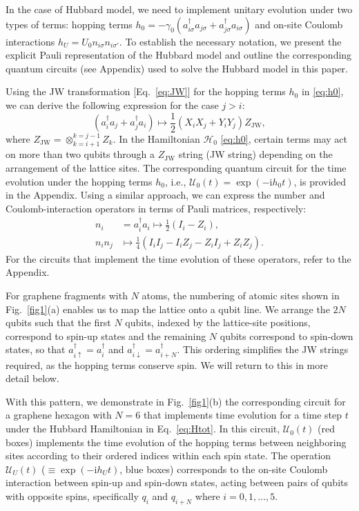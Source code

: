 \documentclass[twocolumn,superscriptaddress,amsmath,amssymb,showpacs,floatfix,preprintnumbers]{revtex4-1}
\newcommand{\rmi}{\mathrm{i}}
\newcommand{\s}{\sigma}
\newcommand{\mc}{\mathcal}
\newcommand{\mr}{\mathrm}
\begin{document}
In the case of Hubbard model, we need to implement unitary evolution under two types of terms:
hopping terms $ h_0 = -\gamma_0 (a^\dagger_{i \s} a_{j \s} + a^\dagger_{j \s} a_{i \s}) $ 
and on-site Coulomb interactions $ h_U = U_0 n_{i \s} n_{i \s'} $.
%
To establish the necessary notation, we present the explicit Pauli representation of the 
Hubbard model and outline the corresponding quantum circuits (see Appendix) used to solve 
the Hubbard model in this paper.

Using the JW transformation [Eq.~\eqref{eq:JW}] for the hopping terms $h_0$ in \eqref{eq:h0}, 
we can derive the following expression for the case $j > i$: 
\begin{equation} \label{eq:hop}
	(a^\dagger_{i} a_{j} + a^\dagger_{j} a_{i}) \mapsto 
	\frac{1}{2}(X_i X_j + Y_i Y_j) Z_\mr{JW},
\end{equation}
%
where $Z_\mr{JW} = \otimes_{k=i+1}^{k=j-1} Z_{k}$.
In the Hamiltonian $\mc H_0$ \eqref{eq:h0}, certain terms may act on more than two qubits 
through a $Z_\mr{JW}$ string (JW string) depending on the arrangement of the lattice sites. 
%
The corresponding quantum circuit for the time evolution under the hopping terms $h_0$, i.e.,
 $ \mc U_0(t) = \exp(-\rmi h_0 t) $, is provided in the Appendix.
%
Using a similar approach, we can express the number and Coulomb-interaction operators 
in terms of Pauli matrices, respectively: 
\begin{align}
	n_{i} &= a^\dagger_{i} a_{i} \mapsto \frac{1}{2}(I_i - Z_i), \label{eq:num} \\ 
	n_{i} n_{j} &\mapsto \frac{1}{4}(I_i I_j - I_i Z_j - Z_i I_j + Z_i Z_j). \label{eq:hub} 
\end{align}
%
For the circuits that implement the time evolution of these operators, refer to the Appendix.

For graphene fragments with $N$ atoms, the numbering of atomic sites shown in
Fig.~\ref{fig1}(a) enables us to map the lattice onto a qubit line.
%
We arrange the $2N$ qubits such that the first $N$ qubits, indexed by the lattice-site positions,
correspond to spin-up states and the remaining $N$ qubits correspond to spin-down states, so that
$ a^\dagger_{i \uparrow} = a^\dagger_{i} $ and $ a^\dagger_{i \downarrow} = a^\dagger_{i+N} $.
%
This ordering simplifies the JW strings required, as the hopping terms conserve spin.
We will return to this in more detail below.

With this pattern,  we demonstrate in Fig.~\ref{fig1}(b) the corresponding circuit for a graphene
hexagon with $N = 6$ that implements time evolution for a time step $t$ under the Hubbard 
Hamiltonian in Eq.~\ref{eq:Htot}.
%
In this circuit, $\mc U_0(t)$ (red boxes) implements the time evolution of the hopping terms between 
neighboring sites according to their ordered indices within each spin state.
%
The operation $ \mc U_U (t)$ ($\equiv \exp(-\rmi h_U t)$, blue boxes) corresponds 
to the on-site Coulomb interaction between spin-up and spin-down states, acting 
between pairs of qubits with opposite spins, specifically $q_i$ and $q_{i+N}$ 
where $i = 0, 1, \ldots, 5$.
\end{document}
